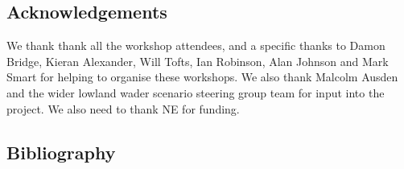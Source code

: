 \documentclass[
  12pt,
  letterpaper,
  DIV=11,
  numbers=noendperiod]{scrartcl}
\begin{document}
\subsection{Acknowledgements}\label{acknowledgements}

We thank thank all the workshop attendees, and a specific thanks to
Damon Bridge, Kieran Alexander, Will Tofts, Ian Robinson, Alan Johnson
and Mark Smart for helping to organise these workshops. We also thank
Malcolm Ausden and the wider lowland wader scenario steering group team
for input into the project. We also need to thank NE for funding.

\newpage{}

\subsection*{Bibliography}\label{bibliography}
\end{document}
